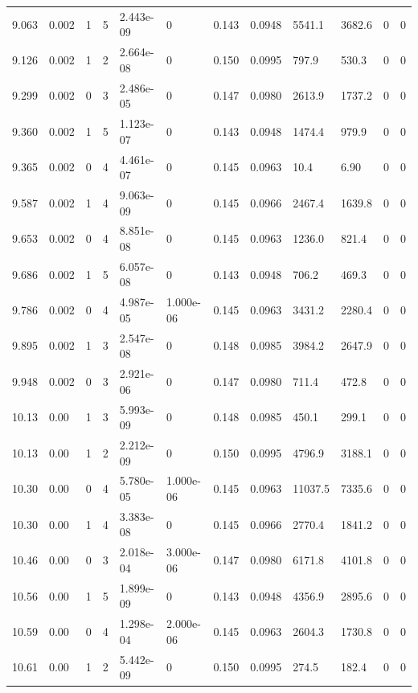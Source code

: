 \documentclass[preview]{standalone}
\begin{document}
{{{{\begin{tabular}{L{1.2cm}C{1.2cm} C{0.3cm}C{0.5cm} C{1.4cm}C{1.4cm} C{1.4cm}C{1.4cm} C{1.6cm}C{1.6cm} C{1.6cm}C{1.6cm}}
  9.063  &  0.002  & 1     &  5 &  2.443e-09  & 0  &  0.143&   0.0948& 5541.1 & 3682.6   &  0 & 0  \\ 
  9.126  &  0.002  & 1     &  2 &  2.664e-08  & 0  &  0.150&   0.0995& 797.9 & 530.3   &  0 & 0  \\ 
  9.299  &  0.002  & 0     &  3 &  2.486e-05  & 0  &  0.147&   0.0980& 2613.9 & 1737.2   &  0 & 0  \\ 
  9.360  &  0.002  & 1     &  5 &  1.123e-07  & 0  &  0.143&   0.0948& 1474.4 & 979.9   &  0 & 0  \\ 
  9.365  &  0.002  & 0     &  4 &  4.461e-07  & 0  &  0.145&   0.0963& 10.4 & 6.90   &  0 & 0  \\ 
  9.587  &  0.002  & 1     &  4 &  9.063e-09  & 0  &  0.145&   0.0966& 2467.4 & 1639.8   &  0 & 0  \\ 
  9.653  &  0.002  & 0     &  4 &  8.851e-08  & 0  &  0.145&   0.0963& 1236.0 & 821.4   &  0 & 0  \\ 
  9.686  &  0.002  & 1     &  5 &  6.057e-08  & 0  &  0.143&   0.0948& 706.2 & 469.3   &  0 & 0  \\ 
  9.786  &  0.002  & 0     &  4 &  4.987e-05  & 1.000e-06  &  0.145&   0.0963& 3431.2 & 2280.4   &  0 & 0  \\ 
  9.895  &  0.002  & 1     &  3 &  2.547e-08  & 0  &  0.148&   0.0985& 3984.2 & 2647.9   &  0 & 0  \\ 
  9.948  &  0.002  & 0     &  3 &  2.921e-06  & 0  &  0.147&   0.0980& 711.4 & 472.8   &  0 & 0  \\ 
  10.13  &  0.00  & 1     &  3 &  5.993e-09  & 0  &  0.148&   0.0985& 450.1 & 299.1   &  0 & 0  \\ 
  10.13  &  0.00  & 1     &  2 &  2.212e-09  & 0  &  0.150&   0.0995& 4796.9 & 3188.1   &  0 & 0  \\ 
  10.30  &  0.00  & 0     &  4 &  5.780e-05  & 1.000e-06  &  0.145&   0.0963& 11037.5 & 7335.6   &  0 & 0  \\ 
  10.30  &  0.00  & 1     &  4 &  3.383e-08  & 0  &  0.145&   0.0966& 2770.4 & 1841.2   &  0 & 0  \\ 
  10.46  &  0.00  & 0     &  3 &  2.018e-04  & 3.000e-06  &  0.147&   0.0980& 6171.8 & 4101.8   &  0 & 0  \\ 
  10.56  &  0.00  & 1     &  5 &  1.899e-09  & 0  &  0.143&   0.0948& 4356.9 & 2895.6   &  0 & 0  \\ 
  10.59  &  0.00  & 0     &  4 &  1.298e-04  & 2.000e-06  &  0.145&   0.0963& 2604.3 & 1730.8   &  0 & 0  \\ 
  10.61  &  0.00  & 1     &  2 &  5.442e-09  & 0  &  0.150&   0.0995& 274.5 & 182.4   &  0 & 0  \\ 

\end{tabular}}}}}
\end{document}
